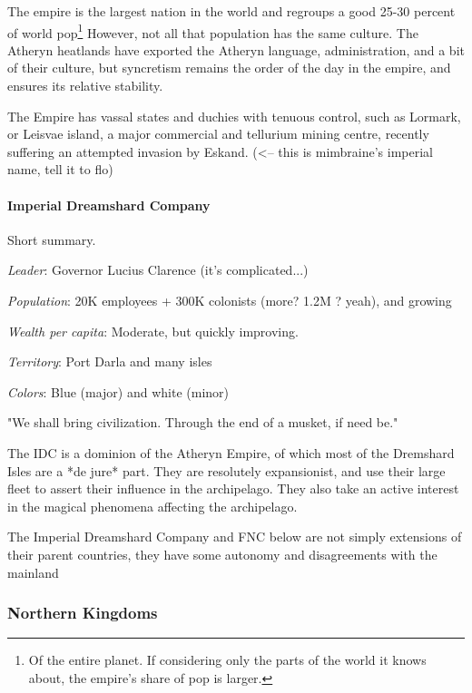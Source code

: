 The empire is the largest nation in the world and regroups a good 25-30 percent of world pop\footnote{Of the entire planet. If considering only the parts of the world it knows about, the empire's share of pop is larger.} However, not all that population has the same culture. The Atheryn heatlands have exported the Atheryn language, administration, and a bit of their culture, but syncretism remains the order of the day in the empire, and ensures its relative stability. 

The Empire has vassal states and duchies with tenuous control, such as Lormark, or Leisvae island, a major commercial and tellurium mining centre, recently suffering an attempted invasion by Eskand. (<-- this is mimbraine's imperial name, tell it to flo)



\paragraph{Imperial Dreamshard Company}

Short summary.

\textit{Leader}: Governor Lucius Clarence (it's complicated...)

\textit{Population}: 20K employees + 300K colonists (more? 1.2M ? yeah), and growing

\textit{Wealth per capita}: Moderate, but quickly improving.

\textit{Territory}: Port Darla and many isles

\textit{Colors}: Blue (major) and white (minor)


\begin{rpg-quotebox}
    "We shall bring civilization. Through the end of a musket, if need be."
    \end{rpg-quotebox}
    



The IDC is a dominion of the Atheryn Empire, of which most of the Dremshard Isles are a *de jure* part. They are resolutely expansionist, and use their large fleet to assert their influence in the archipelago. They also take an active interest in the magical phenomena affecting the archipelago.


The Imperial Dreamshard Company and FNC below are not simply extensions of their parent countries, they have some autonomy and disagreements with the mainland



\subsubsection{Northern Kingdoms}

